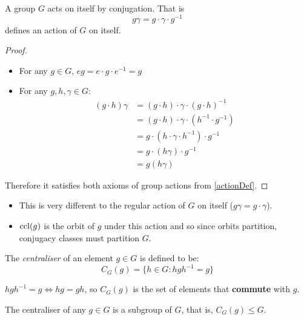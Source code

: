 \documentclass[../main.tex]{subfiles}
\begin{document}
\begin{proposition}
  A group $G$ acts on itself by conjugation.
  That is
  \[
    g\gamma = g \cdot \gamma \cdot g^{-1}
  \]
  defines an action of $G$ on itself.
\end{proposition}
\begin{proof}
  \begin{itemize}
    \item For any $g \in G$, $eg = e \cdot g \cdot e^{-1} = g$
    \item For any $g, h, \gamma \in G$:
      \begin{align*}
        (g \cdot h)\gamma &= (g \cdot h) \cdot \gamma \cdot (g \cdot h)^{-1} \\
                          &= (g \cdot h) \cdot \gamma \cdot (h^{-1} \cdot g^{-1}) \\
                          &= g \cdot (h \cdot \gamma \cdot h^{-1}) \cdot g^{-1} \\
                          &= g \cdot (h\gamma) \cdot g^{-1} \\
                          &= g(h\gamma)
      \end{align*}
  \end{itemize}
  Therefore it satisfies both axioms of group actions from \cref{actionDef}.
\end{proof}
\begin{remark}[Remarks]
  \begin{itemize}
    \item This is very different to the regular action of $G$ on itself ($g\gamma = g \cdot \gamma$).
    \item $\operatorname{ccl}(g)$ is the orbit of $g$ under this action and so since orbits partition, conjugacy classes must partition $G$.
  \end{itemize}
\end{remark}
\begin{definition}[Centraliser]
  The \textit{centraliser} of an element $g \in G$ is defined to be:
  \[
    C_G(g) = \{h \in G: h g h^{-1} = g\}
  \]
\end{definition}
\begin{remark}[Note]
  $h g h^{-1} = g \iff hg = gh$, so $C_G(g)$ is the set of elements that \textbf{commute} with $g$.
\end{remark}
\begin{proposition}
  The centraliser of any $g \in G$ is a subgroup of $G$, that is, $C_G(g) \leq G$.
  \label{centraliserSubgroup}
\end{proposition}
\end{document}
